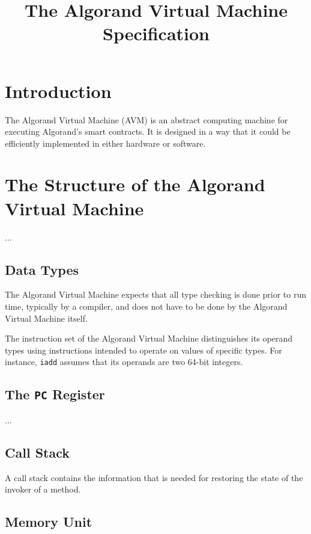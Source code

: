 \documentclass[11pt]{article}
\title{The Algorand Virtual Machine Specification}
\begin{document}
    \maketitle


    \section{Introduction}\label{sec:introduction}

    The Algorand Virtual Machine (AVM) is an abstract computing machine for executing Algorand's smart contracts.
    It is designed in a way that it could be efficiently implemented in either hardware or software.


    \section{The Structure of the Algorand Virtual Machine}\label{sec:the-structure-of-the-algorand-virtual-machine}

    ...

    \subsection{Data Types}\label{subsec:data-types}

    The Algorand Virtual Machine expects that all type checking is done prior to run time, typically by a compiler,
    and does
    not have to be done by the Algorand Virtual Machine itself.

    The instruction set of the Algorand Virtual Machine distinguishes its operand types using instructions intended to
    operate on values of specific types.
    For instance, \texttt{iadd} assumes that its operands are two 64-bit integers.

    \subsection{The \texttt{PC} Register}\label{subsec:the-pc-register}

    ...

    \subsection{Call Stack}\label{subsec:call-stack}

    A call stack contains the information that is needed for restoring the state of the invoker of a method.

    \subsection{Memory Unit}\label{subsec:memory-unit}
\end{document}
